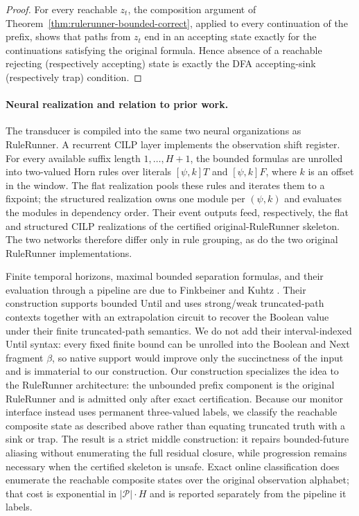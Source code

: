 \begin{proof}
For every reachable $z_t$, the composition argument of
Theorem~\ref{thm:rulerunner-bounded-correct}, applied to every continuation of
the prefix, shows that paths from $z_t$ end in an accepting state exactly for
the continuations satisfying the original formula.  Hence absence of a
reachable rejecting (respectively accepting) state is exactly the DFA
accepting-sink (respectively trap) condition.
\end{proof}

\paragraph{Neural realization and relation to prior work.}
The transducer is compiled into the same two neural organizations as
RuleRunner.  A recurrent CILP layer implements the observation shift register.
For every available suffix length $1,\ldots,H+1$, the bounded formulas are
unrolled into two-valued Horn rules over literals $[\psi,k]T$ and $[\psi,k]F$,
where $k$ is an offset in the window.  The flat realization pools these rules
and iterates them to a fixpoint; the structured realization owns one module per
$(\psi,k)$ and evaluates the modules in dependency order.  Their event outputs
feed, respectively, the flat and structured CILP realizations of the certified
original-RuleRunner skeleton.  The two networks therefore differ only in rule
grouping, as do the two original RuleRunner implementations.

Finite temporal horizons, maximal bounded separation formulas, and their
evaluation through a pipeline are due to Finkbeiner and Kuhtz
\cite{finkbeiner2009monitor}.  Their construction supports bounded Until and
uses strong/weak truncated-path contexts together with an extrapolation circuit
to recover the Boolean value under their finite truncated-path semantics.  We
do not add their interval-indexed Until syntax: every fixed finite bound can be
unrolled into the Boolean and Next fragment $\beta$, so native support would
improve only the succinctness of the input and is immaterial to our construction.
Our
construction specializes the idea to the RuleRunner architecture: the
unbounded prefix component is the original RuleRunner and is admitted only
after exact certification.  Because our monitor interface instead uses
permanent three-valued labels, we classify the reachable composite state as
described above rather than equating truncated truth with a sink or trap.  The
result is a strict middle construction: it repairs bounded-future aliasing
without enumerating the full residual closure, while progression remains
necessary when the certified skeleton is unsafe.  Exact online classification
does enumerate the reachable composite states over the original observation
alphabet; that cost is exponential in $|\mathcal P|\cdot H$ and is reported
separately from the pipeline it labels.


